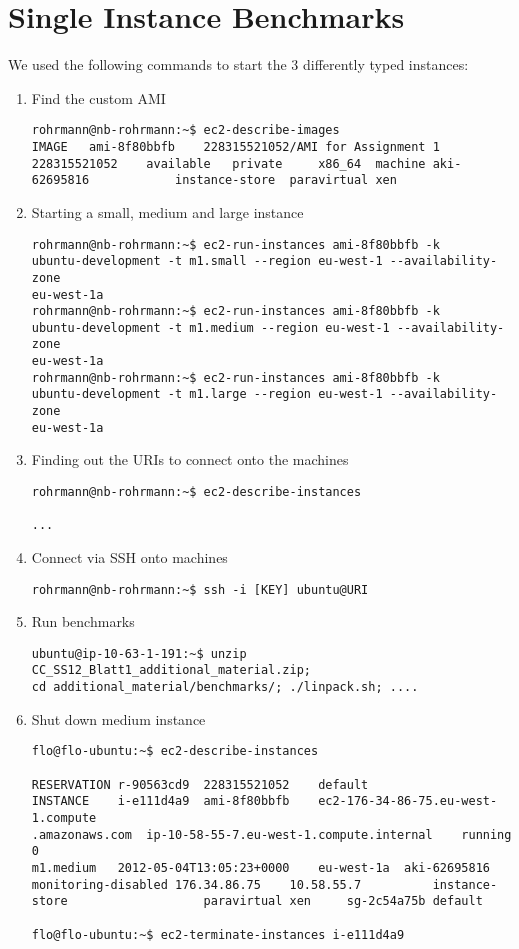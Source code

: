 \documentclass{article}
\begin{document}
\section{Single Instance Benchmarks}
We used the following commands to start the 3 differently typed instances:
\begin{enumerate}
	\item Find the custom AMI
\begin{verbatim}
rohrmann@nb-rohrmann:~$ ec2-describe-images
IMAGE	ami-8f80bbfb	228315521052/AMI for Assignment 1	228315521052	available	private		x86_64	machine	aki-62695816			instance-store	paravirtual	xen
\end{verbatim}
	\item Starting a small, medium and large instance
\begin{verbatim}
rohrmann@nb-rohrmann:~$ ec2-run-instances ami-8f80bbfb -k 
ubuntu-development -t m1.small --region eu-west-1 --availability-zone 
eu-west-1a
rohrmann@nb-rohrmann:~$ ec2-run-instances ami-8f80bbfb -k 
ubuntu-development -t m1.medium --region eu-west-1 --availability-zone 
eu-west-1a
rohrmann@nb-rohrmann:~$ ec2-run-instances ami-8f80bbfb -k 
ubuntu-development -t m1.large --region eu-west-1 --availability-zone 
eu-west-1a
\end{verbatim}	
	\item Finding out the URIs to connect onto the machines
\begin{verbatim}
rohrmann@nb-rohrmann:~$ ec2-describe-instances

...
\end{verbatim}
	\item Connect via SSH onto machines
\begin{verbatim}
rohrmann@nb-rohrmann:~$ ssh -i [KEY] ubuntu@URI
\end{verbatim}
	\item Run benchmarks
\begin{verbatim}
ubuntu@ip-10-63-1-191:~$ unzip CC_SS12_Blatt1_additional_material.zip; 
cd additional_material/benchmarks/; ./linpack.sh; ....
\end{verbatim}
	\item Shut down medium instance

\begin{verbatim}
flo@flo-ubuntu:~$ ec2-describe-instances

RESERVATION	r-90563cd9	228315521052	default
INSTANCE	i-e111d4a9	ami-8f80bbfb	ec2-176-34-86-75.eu-west-1.compute
.amazonaws.com	ip-10-58-55-7.eu-west-1.compute.internal	running		0		
m1.medium	2012-05-04T13:05:23+0000	eu-west-1a	aki-62695816			
monitoring-disabled	176.34.86.75	10.58.55.7			instance-
store					paravirtual	xen		sg-2c54a75b	default

flo@flo-ubuntu:~$ ec2-terminate-instances i-e111d4a9
\end{verbatim}
\end{enumerate}
\end{document}
